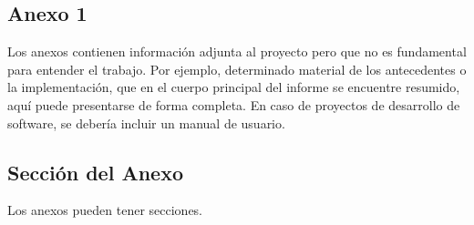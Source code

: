 \documentclass{prgrado}
\begin{document}
{ %

\backmatter %


\newpage



} %



\begin{appendix}

\chapter{Anexo 1}

Los anexos contienen información adjunta al proyecto pero que no es fundamental
para entender el trabajo. Por ejemplo, determinado material de los antecedentes o la
implementación, que en el cuerpo principal del informe se encuentre resumido, aquí
puede presentarse de forma completa. En caso de proyectos de desarrollo de
software, se debería incluir un manual de usuario.

\section{Sección del Anexo}

Los anexos pueden tener secciones.

\end{appendix}


\end{document}
